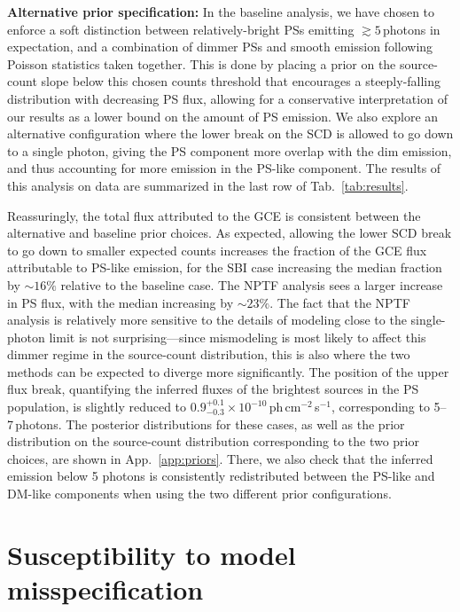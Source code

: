 \documentclass[prd,aps,10pt,nofootinbib,twocolumn,superscriptaddress,preprintnumbers,balancelastpage,longbibliography,floatfix]{revtex4-2}
\begin{document}
\noindent
\textbf{Alternative prior specification:}
In the baseline analysis, we have chosen to enforce a soft distinction between relatively-bright PSs emitting $\gtrsim 5$\,photons in expectation, and a combination of dimmer PSs and smooth emission following Poisson statistics taken together. This is done by placing a prior on the source-count slope below this chosen counts threshold that encourages a steeply-falling distribution with decreasing PS flux, allowing for a conservative interpretation of our results as a lower bound on the amount of PS emission. We also explore an alternative configuration where the lower break on the SCD is allowed to go down to a single photon, giving the PS component more overlap with the dim emission, and thus accounting for more emission in the PS-like component. The results of this analysis on data are summarized in the last row of Tab.~\ref{tab:results}.

Reassuringly, the total flux attributed to the GCE is consistent between the alternative and baseline prior choices. As expected, allowing the lower SCD break to go down to smaller expected counts increases the fraction of the GCE flux attributable to PS-like emission, for the SBI case increasing the median fraction by $\sim16\%$ relative to the baseline case. The NPTF analysis sees a larger increase in PS flux, with the median increasing by $\sim23\%$. The fact that the NPTF analysis is relatively more sensitive to the details of modeling close to the single-photon limit is not surprising---since mismodeling is most likely to affect this dimmer regime in the source-count distribution, this is also where the two methods can be expected to diverge more significantly. 
The position of the upper flux break, quantifying the inferred fluxes of the brightest sources in the PS population, is slightly reduced to $0.9^{+0.1}_{-0.3}\times 10^{-10}$\,ph\,cm$^{-2}$\,s$^{-1}$, corresponding to 5--7\,photons.
The posterior distributions for these cases, as well as the prior distribution on the source-count distribution corresponding to the two prior choices, are shown in App.~\ref{app:priors}. There, we also check that the inferred emission below 5 photons is consistently redistributed between the PS-like and DM-like components when using the two different prior configurations.

\section{Susceptibility to model misspecification}
\label{sec:mismodeling}
\end{document}

